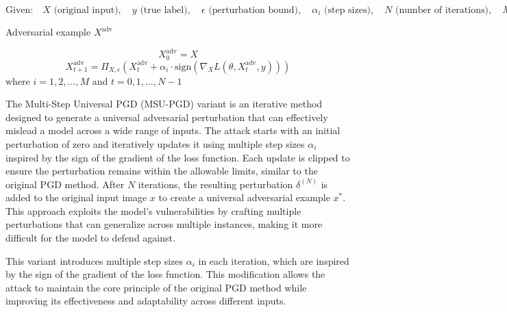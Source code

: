 \[
\text{Given:} \quad X \text{ (original input)}, \quad y \text{ (true label)}, \quad \epsilon \text{ (perturbation bound)}, \quad \alpha_i \text{ (step sizes)}, \quad N \text{ (number of iterations)}, \quad M \text{ (number of step sizes)}
\]

Adversarial example $X^{\text{adv}}$


\[
X^{\text{adv}}_0 = X
\]
\[
X^{\text{adv}}_{t+1} = \Pi_{X, \epsilon} \left( X^{\text{adv}}_t + \alpha_i \cdot \text{sign} \left( \nabla_X L(\theta, X^{\text{adv}}_t, y) \right) \right)
\]
where $i = 1, 2, \ldots, M$ and $t = 0, 1, \ldots, N-1$

The Multi-Step Universal PGD (MSU-PGD) variant is an iterative method designed to generate a universal adversarial perturbation that can effectively mislead a model across a wide range of inputs. The attack starts with an initial perturbation of zero and iteratively updates it using multiple step sizes $\alpha_i$ inspired by the sign of the gradient of the loss function. Each update is clipped to ensure the perturbation remains within the allowable limits, similar to the original PGD method. After $N$ iterations, the resulting perturbation $\delta^{(N)}$ is added to the original input image $x$ to create a universal adversarial example $x^*$. This approach exploits the model's vulnerabilities by crafting multiple perturbations that can generalize across multiple instances, making it more difficult for the model to defend against.

This variant introduces multiple step sizes $\alpha_i$ in each iteration, which are inspired by the sign of the gradient of the loss function. This modification allows the attack to maintain the core principle of the original PGD method while improving its effectiveness and adaptability across different inputs.